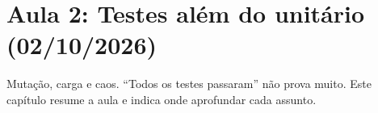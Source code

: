 \chapter{Aula 2: Testes além do unitário (02/10/2026)}
\label{cap:aula2}

Mutação, carga e caos. \enquote{Todos os testes passaram} não prova muito.
Este capítulo resume a aula e indica onde aprofundar cada assunto.









